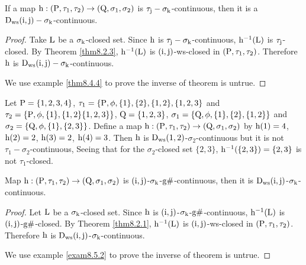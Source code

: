 \begin{thm}\label{thm8.5.1}
If a map $\mathrm{h} :(\mathrm{P}, \tau_1, \tau_2 )\to (\mathrm{Q}, \sigma_{1}, \sigma_{2} )$ is $\tau_{\mathrm{j}}-\sigma_{\mathrm{k}}$-continuous, then it is a $\mathrm{D}_{\mathrm{ws}} (\mathrm{i}, \mathrm{j})-\sigma_{\mathrm{k}}$-continuous.
\end{thm}

\begin{proof}
Take $\mathrm{L}$ be a $\sigma_{\mathrm{k}}$-closed set. Since $\mathrm{h}$ is $\tau_{\mathrm{j}}-\sigma_{\mathrm{k}}$-continuous, $\mathrm{h}^{-1} (\mathrm{L})$ is $\tau_{\mathrm{j}}$-closed. By Theorem \ref{thm8.2.3}, $\mathrm{h}^{-1} (\mathrm{L})$ is $(\mathrm{i}, \mathrm{j})$-ws-closed in $(\mathrm{P}, \tau_1, \tau_2 )$. Therefore $\mathrm{h}$ is $\mathrm{D}_{\mathrm{ws}}(\mathrm{i}, \mathrm{j})-\sigma_{\mathrm{k}}$-continuous.

We use example \ref{thm8.4.4} to prove the inverse of theorem is untrue.
\end{proof}

\begin{exm}\label{exma8.5.1}
Let $\mathrm{P}=\{1, 2, 3, 4\}$, $\tau_1 =\{\mathrm{P}, \phi, \{1\},\{2\},\{1,2\},\{1,2,3\}$ and $\tau_2 =\{\mathrm{P}, \phi, \{1\},\{1, 2\}\{1,2, 3\}\}$, $\mathrm{Q}=\{1, 2, 3\}$, $\sigma_{1} =\{\mathrm{Q}, \phi, \{1\},\{2\},\{1,2\}\}$ and $\sigma_{2} =\{\mathrm{Q}, \phi, \{1\},\{2,3\}\}$. Define a map $\mathrm{h}: (\mathrm{P},\tau_1, \tau_2 )\to (\mathrm{Q}, \sigma_{1}, \sigma_{2} )$ by $\mathrm{h}(1)=4$, $\mathrm{h}(2)=2$, $\mathrm{h}(3)=2$, $\mathrm{h}(4)=3$. Then $\mathrm{h}$ is $\mathrm{D}_{\mathrm{ws}}(1, 2)$-$\sigma_{2}$-continuous but it is not $\tau_1-\sigma_{2}$-continuous, Seeing that for the $\sigma_{2}$-closed set $\{2,3\}$, $\mathrm{h}^{-1}(\{2,3\})=\{2, 3\}$ is not $\tau_1$-closed.
\end{exm}

\begin{thm}\label{thm8.5.2}
Map $\mathrm{h}: (\mathrm{P}, \tau_1, \tau_2 )\to (\mathrm{Q}, \sigma_{1}, \sigma_{2} )$ is $(\mathrm{i}, \mathrm{j})$-$\sigma_{\mathrm{k}}$-$\mathrm{g}\#$-continuous, then it is $\mathrm{D}_{\mathrm{ws}} (\mathrm{i}, \mathrm{j})$-$\sigma_{\mathrm{k}}$-continuous.
\end{thm}

\begin{proof}
Let $\mathrm{L}$ be a $\sigma_{\mathrm{k}}$-closed set. Since $\mathrm{h}$ is $(\mathrm{i}, \mathrm{j})$-$\sigma_{\mathrm{k}}$-$\mathrm{g}\#$-continuous, $\mathrm{h}^{-1}(\mathrm{L})$ is $(\mathrm{i}, \mathrm{j})$-$\mathrm{g}\#$-closed. By Theorem \ref{thm8.2.1}, $\mathrm{h}^{-1}(\mathrm{L})$ is $(\mathrm{i}, \mathrm{j})$-ws-closed in $(\mathrm{P}, \tau_1, \tau_2 )$. Therefore $\mathrm{h}$ is $\mathrm{D}_{\mathrm{ws}} (\mathrm{i}, \mathrm{j})$-$\sigma_{\mathrm{k}}$-continuous.

We use example \ref{exam8.5.2} to prove the inverse of theorem is untrue.
\end{proof}


